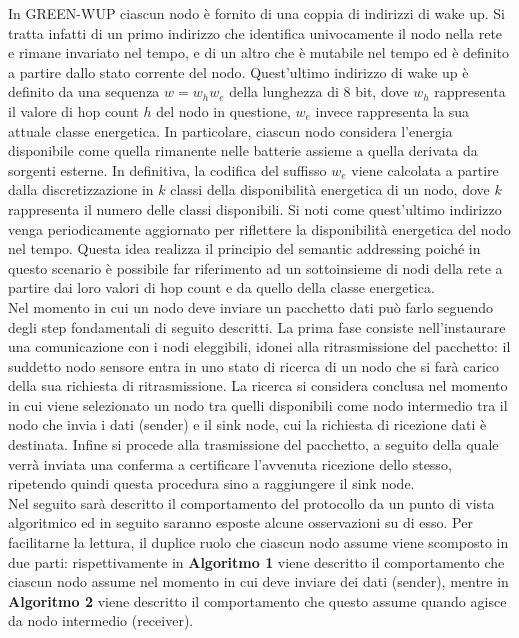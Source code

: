 \documentclass[binding=0.6cm,TFA]{sapthesis}
\begin{document}
In GREEN-WUP ciascun nodo è fornito di una coppia di indirizzi di wake up. Si tratta infatti di un primo indirizzo che identifica univocamente
il nodo nella rete e rimane invariato nel tempo, e di un altro che è mutabile nel tempo ed è definito a partire dallo stato corrente del nodo.
Quest'ultimo indirizzo di wake up è definito da una sequenza $w=w_{h}w_{e}$ della lunghezza di 8 bit, dove $w_{h}$ rappresenta il valore di hop
count $h$ del nodo in questione, $w_{e}$ invece rappresenta la sua attuale classe energetica. In particolare, ciascun nodo considera
l'energia disponibile come quella rimanente nelle batterie assieme a quella derivata da sorgenti esterne. In definitiva, la codifica del suffisso
$w_{e}$ viene calcolata a partire dalla discretizzazione in $k$ classi della disponibilità energetica di un nodo, dove $k$ rappresenta il
numero delle classi disponibili. Si noti come quest'ultimo indirizzo venga periodicamente aggiornato per riflettere la disponibilità
energetica del nodo nel tempo. Questa idea realizza il principio del semantic addressing poiché in questo scenario è possibile far riferimento
ad un sottoinsieme di nodi della rete a partire dai loro valori di hop count e da quello della classe energetica. \\

Nel momento in cui un nodo deve inviare un pacchetto dati può farlo seguendo degli step fondamentali di seguito descritti.
La prima fase consiste nell'instaurare una comunicazione con i nodi eleggibili, idonei alla ritrasmissione del pacchetto: il suddetto nodo sensore
entra in uno stato di ricerca di un nodo che si farà carico della sua richiesta di ritrasmissione. La ricerca si considera conclusa
nel momento in cui viene selezionato un nodo tra quelli disponibili come nodo intermedio tra il nodo che invia i dati (sender) e il sink
node, cui la richiesta di ricezione dati è destinata. Infine si procede alla trasmissione del pacchetto, a seguito della quale
verrà inviata una conferma a certificare l'avvenuta ricezione dello stesso, ripetendo quindi questa procedura sino a raggiungere
il sink node.\\

Nel seguito sarà descritto il comportamento del protocollo da un punto di vista algoritmico ed in seguito saranno esposte alcune osservazioni su di esso.
Per facilitarne la lettura, il duplice ruolo che ciascun nodo assume viene scomposto in due parti: rispettivamente in \textbf{Algoritmo 1}
viene descritto il comportamento che ciascun nodo assume nel momento in cui deve inviare dei dati (sender), mentre in \textbf{Algoritmo 2}
viene descritto il comportamento che questo assume quando agisce da nodo intermedio (receiver).
\end{document}
